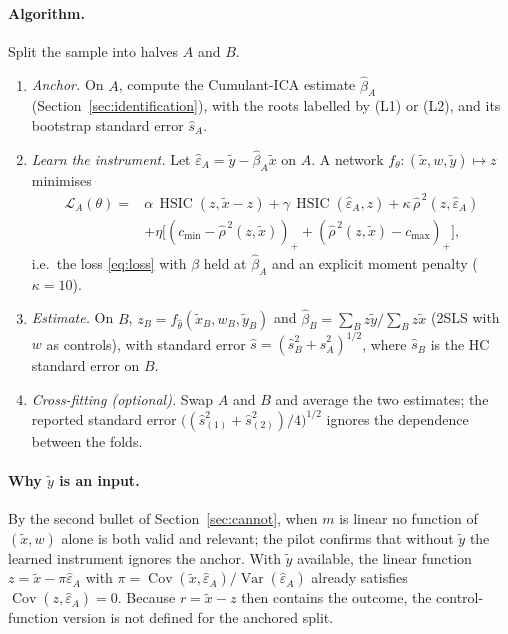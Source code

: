 \documentclass[11pt]{article}
\theoremstyle{definition}
\theoremstyle{remark}
\newcommand{\Var}{\operatorname{Var}}
\newcommand{\Cov}{\operatorname{Cov}}
\newcommand{\HSIC}{\operatorname{HSIC}}
\newcommand{\tx}{\tilde{x}}
\newcommand{\ty}{\tilde{y}}
\begin{document}
\paragraph{Algorithm.} Split the sample into halves $A$ and $B$.
\begin{enumerate}[label=(\roman*)]
  \item \emph{Anchor.} On $A$, compute the Cumulant-ICA estimate $\hat\beta_A$ (Section~\ref{sec:identification}),
  with the roots labelled by (L1) or (L2), and its bootstrap standard error $\hat s_A$.
  \item \emph{Learn the instrument.} Let $\hat\varepsilon_A=\ty-\hat\beta_A\tx$ on $A$. A network
  $f_\theta:(\tx,w,\ty)\mapsto z$ minimises
  \begin{equation}\label{eq:anchored-loss}
  \begin{aligned}
  \mathcal{L}_A(\theta) ={}& \alpha\,\HSIC(z,\tx-z) + \gamma\,\HSIC(\hat\varepsilon_A,z)
     + \kappa\,\hat\rho^{\,2}(z,\hat\varepsilon_A)\\
     &+ \eta\big[(c_{\min}-\hat\rho^{\,2}(z,\tx))_+ + (\hat\rho^{\,2}(z,\tx)-c_{\max})_+\big],
  \end{aligned}
  \end{equation}
  i.e.\ the loss \eqref{eq:loss} with $\beta$ held at $\hat\beta_A$ and an explicit moment penalty
  ($\kappa=10$).
  \item \emph{Estimate.} On $B$, $z_B=f_{\hat\theta}(\tx_B,w_B,\ty_B)$ and
  $\hat\beta_B = \sum_B z\ty/\sum_B z\tx$ (2SLS with $w$ as controls), with standard error
  $\hat s = (\hat s_B^2+\hat s_A^2)^{1/2}$, where $\hat s_B$ is the HC standard error on $B$.
  \item \emph{Cross-fitting (optional).} Swap $A$ and $B$ and average the two estimates; the
  reported standard error $\big((\hat s^2_{(1)}+\hat s^2_{(2)})/4\big)^{1/2}$ ignores the dependence
  between the folds.
\end{enumerate}

\paragraph{Why $\ty$ is an input.} By the second bullet of Section~\ref{sec:cannot}, when $m$ is
linear no function of $(\tx,w)$ alone is both valid and relevant; the pilot confirms that without
$\ty$ the learned instrument ignores the anchor. With $\ty$ available, the linear function
$z = \tx - \pi\hat\varepsilon_A$ with
$\pi=\Cov(\tx,\hat\varepsilon_A)/\Var(\hat\varepsilon_A)$ already satisfies
$\Cov(z,\hat\varepsilon_A)=0$. Because $r=\tx-z$ then contains the outcome, the control-function
version is not defined for the anchored split.
\end{document}
